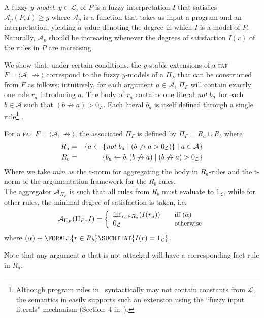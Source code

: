 \documentclass[12pt,a4paper]{article}
\newcommand{\Forall}[2]{\ensuremath{\FORALL{#1} \SUCHTHAT {#2}}}
\newcommand{\mc}[1]{\ensuremath{\mathcal{#1}}}
\newcommand{\abfaf}{\textsc{faf}}
\newcommand{\attack}{\ensuremath{\not\rightarrow}}
\newcommand{\af}[2]{\ensuremath{\langle{#1},{#2}\rangle}}
\newcommand{\Lattice}{\ensuremath{\mc{L}}}
\begin{document}
A fuzzy $y$-\emph{model}, $y\in\Lattice$, of $P$ is a fuzzy
interpretation $I$ that satisfies $\mc{A}_p (P,I) \geq y$
where $\mc{A}_p$ is a function that takes as input a program and an
interpretation, yielding a value denoting the degree in which
$I$ is a model of $P$. Naturally, $\mc{A}_p$ should be increasing
whenever the degrees of satisfaction $I(r)$ of the rules in $P$ are
increasing.

We show that, under certain conditions, the $y$-stable extensions
of a \abfaf{} $F=\af{\mc{A}}{\attack}$ correspond to the fuzzy $y$-models %
of a \abfasp{} $\Pi_F$ that can be constructed from $F$ as follows: 
intuitively, 
for each argument $a\in\mc{A}$, $\Pi_F$ will contain
exactly one rule $r_a$ introducing $a$. The body of $r_a$ contains
one literal $\mathit{not}\;b_a$ for each $b\in\mc{A}$ such that $(b\attack
a)>0_\Lattice{}$. Each literal $b_a$ is itself defined through a
single rule\footnote{
  Although program rules in~\cite{fasp0} syntactically may not contain
  constants from \Lattice{}, the semantics in \cite{fasp0} easily supports
  such an extension using the ``fuzzy input literals'' mechanism
  (Section~4 in~\cite{fasp0}).
} \prule{b_a}{b, (b\attack a)}.

\begin{definition}
For a \abfaf{} $F=\af{\mc{A}}{\attack}$, the associated \abfasp{} $\Pi_F$
is defined by $\Pi_F = R_a \cup R_b$
where
\begin{eqnarray*}
R_a & = & \set{ \prule{a}{
                     \set{\naf{b_a} \mid (b \attack a > 0_\Lattice{})}
                    } \mid a\in\mc{A}} \\
R_b & = & \set{ \prule{b_a}{b, (b\attack a)} \mid (b\attack{}a)>0_\Lattice{} }
\end{eqnarray*}
Where we take $min$ as the t-norm for aggregating the body in $R_a$-rules and the t-norm
of the argumentation framework for the $R_b$-rules.\\
The aggregator $\mc{A}_{\Pi_F}$ is such that all rules from $R_b$ must
evaluate to $1_\Lattice{}$, while for other rules, the minimal
degree of satisfaction is taken, i.e.
\[
\mc{A}_{\Pi_F}(\Pi_F, I) = \left\{
  \begin{array}{l@{\quad\quad}l}
  \infof{r_a \in R_a}{I(r_a)} & \mbox{\small iff ($\alpha$)}\\
  0_\Lattice{} & \mbox{\small otherwise}
  \end{array}
  \right.
\]
where $(\alpha) \equiv \Forall{r\in R_b}{I(r) = 1_\Lattice{}}$.
\end{definition}
Note that any argument $a$ that is not attacked will have a corresponding fact 
rule  in $R_a$.
\end{document}
